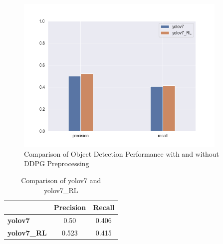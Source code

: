 \documentclass{PHlab-thesis}
\begin{document}
\begin{figure}[H] 
    \centering 
    \includegraphics[width=0.9\textwidth]{images/comparison result.png}
    \caption[Comparison Result]{Comparison of Object Detection Performance with and without DDPG Preprocessing} 
    \label{Fig.Comparison result} 
\end{figure}

\begin{table}[H]
    \centering
    \caption{Comparison of yolov7 and yolov7\_RL}
    \label{table:comparison_result}
    \begin{tabular}{l c c}
        \toprule
        & \textbf{Precision} & \textbf{Recall} \\
        \midrule
        \textbf{yolov7} & 0.50 & 0.406 \\
        \textbf{yolov7\_RL} & 0.523 & 0.415 \\
        \bottomrule
    \end{tabular}
\end{table}

\newpage
\end{document}
